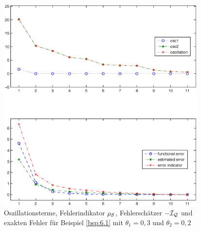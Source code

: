 \begin{bsp}
\begin{figure}[h]
\begin{center}
\includegraphics[width=10.5cm]{Abbildungen/adaptive_solution_example1.ps}
\end{center}
\caption[Diagramm mit dem Fehler und der Oszillation für Beispiel \ref{bsp:6.1}]{Oszillationsterme, Fehlerindikator $\rho_{\mathcal S}$, Fehlerschätzer $-\mathcal I_{\mathcal Q}$ und exakten Fehler für Beispiel \ref{bsp:6.1} mit $\theta_1=0,3$ und $\theta_2=0,2$\label{abb:6.3}}
\end{figure}
\end{bsp}


